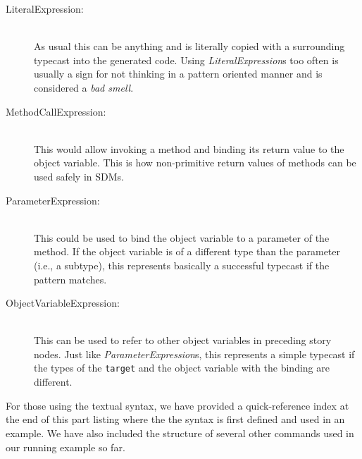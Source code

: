 \begin{description}
  
  \item[LiteralExpression:]~\\ 
  As usual this can be anything and is literally copied with a surrounding typecast 
  into the generated code.  Using \emph{LiteralExpression}s too often is usually a sign 
  for not thinking in a pattern oriented manner and is considered a \emph{bad smell}.
  
  \vspace{0.5cm}
  
  \item[MethodCallExpression:]~\\ 
  This would allow invoking a method and binding its return value to the object variable.  
  This is how non-primitive return values of methods can be used safely in SDMs.
  
  \vspace{0.5cm}
  
  \item[ParameterExpression:]~\\ 
  This could be used to bind the object variable to a parameter of the method.  
  If the object variable is of a different type than the parameter (i.e., a subtype), 
  this represents basically a successful typecast if the pattern matches.
  
  \newpage
  
  \item[ObjectVariableExpression:]~\\ 
  This can be used to refer to other object variables in preceding story nodes.  
  Just like \emph{ParameterExpression}s, this represents a simple typecast if the 
  types of the \texttt{target} and the object variable with the binding are different.

\end{description}

For those using the textual syntax, we have provided a quick-reference index at the end of this part listing where the the syntax is first defined and used in
an example. We have also included the structure of several other commands used in our running example so far.
